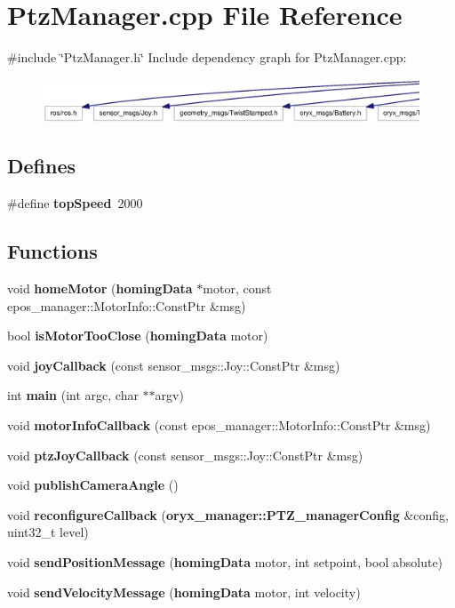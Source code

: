 \section{\-Ptz\-Manager.\-cpp \-File \-Reference}
\label{PtzManager_8cpp}
{\ttfamily \#include \char`\"{}\-Ptz\-Manager.\-h\char`\"{}}\*
\-Include dependency graph for \-Ptz\-Manager.\-cpp\-:
\nopagebreak
\begin{figure}[H]
\begin{center}
\leavevmode
\includegraphics[width=350pt]{PtzManager_8cpp__incl}
\end{center}
\end{figure}
\subsection*{\-Defines}
\begin{DoxyCompactItemize}
\item 
\#define {\bf top\-Speed}~2000
\end{DoxyCompactItemize}
\subsection*{\-Functions}
\begin{DoxyCompactItemize}
\item 
void {\bf home\-Motor} ({\bf homing\-Data} $\ast$motor, const epos\-\_\-manager\-::\-Motor\-Info\-::\-Const\-Ptr \&msg)
\item 
bool {\bf is\-Motor\-Too\-Close} ({\bf homing\-Data} motor)
\item 
void {\bf joy\-Callback} (const sensor\-\_\-msgs\-::\-Joy\-::\-Const\-Ptr \&msg)
\item 
int {\bf main} (int argc, char $\ast$$\ast$argv)
\item 
void {\bf motor\-Info\-Callback} (const epos\-\_\-manager\-::\-Motor\-Info\-::\-Const\-Ptr \&msg)
\item 
void {\bf ptz\-Joy\-Callback} (const sensor\-\_\-msgs\-::\-Joy\-::\-Const\-Ptr \&msg)
\item 
void {\bf publish\-Camera\-Angle} ()
\item 
void {\bf reconfigure\-Callback} ({\bf oryx\-\_\-manager\-::\-P\-T\-Z\-\_\-manager\-Config} \&config, uint32\-\_\-t level)
\item 
void {\bf send\-Position\-Message} ({\bf homing\-Data} motor, int setpoint, bool absolute)
\item 
void {\bf send\-Velocity\-Message} ({\bf homing\-Data} motor, int velocity)
\end{DoxyCompactItemize}


